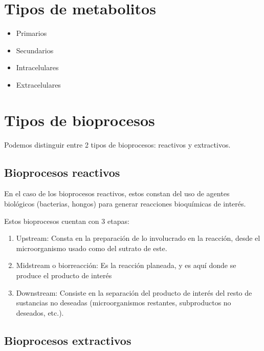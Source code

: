 


\section{Tipos de metabolitos}

\begin{itemize}
    \item Primarios
    \item Secundarios
\end{itemize}

\begin{itemize}
    \item Intracelulares
    \item Extracelulares
\end{itemize}

\section{Tipos de bioprocesos}

Podemos distinguir entre 2 tipos de bioprocesos: reactivos y extractivos.

\subsection{Bioprocesos reactivos}

En el caso de los bioprocesos reactivos, estos constan del uso de agentes biológicos (bacterias, hongos) para generar reacciones bioquímicas de interés.

Estos bioprocesos cuentan con 3 etapas:

\begin{enumerate}
    \item Upstream: Consta en la preparación de lo involucrado en la reacción, desde el microorganismo usado como del sutrato de este.
    \item Midstream o biorreacción: Es la reacción planeada, y es aquí donde se produce el producto de interés
    \item Downstream: Consiste en la separación del producto de interés del resto de sustancias no deseadas (microorganismos restantes, subproductos no deseados, etc.).
\end{enumerate}

\subsection{Bioprocesos extractivos}

